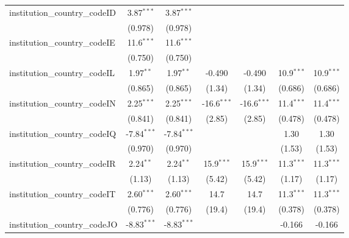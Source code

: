 \begin{tabular}{lcccccc}
   institution\_country\_codeID          & 3.87$^{***}$   & 3.87$^{***}$   &               &               &               &   \\   
                                         & (0.978)        & (0.978)        &               &               &               &   \\   
   institution\_country\_codeIE          & 11.6$^{***}$   & 11.6$^{***}$   &               &               &               &   \\   
                                         & (0.750)        & (0.750)        &               &               &               &   \\   
   institution\_country\_codeIL          & 1.97$^{**}$    & 1.97$^{**}$    & -0.490        & -0.490        & 10.9$^{***}$  & 10.9$^{***}$\\   
                                         & (0.865)        & (0.865)        & (1.34)        & (1.34)        & (0.686)       & (0.686)\\   
   institution\_country\_codeIN          & 2.25$^{***}$   & 2.25$^{***}$   & -16.6$^{***}$ & -16.6$^{***}$ & 11.4$^{***}$  & 11.4$^{***}$\\   
                                         & (0.841)        & (0.841)        & (2.85)        & (2.85)        & (0.478)       & (0.478)\\   
   institution\_country\_codeIQ          & -7.84$^{***}$  & -7.84$^{***}$  &               &               & 1.30          & 1.30\\   
                                         & (0.970)        & (0.970)        &               &               & (1.53)        & (1.53)\\   
   institution\_country\_codeIR          & 2.24$^{**}$    & 2.24$^{**}$    & 15.9$^{***}$  & 15.9$^{***}$  & 11.3$^{***}$  & 11.3$^{***}$\\   
                                         & (1.13)         & (1.13)         & (5.42)        & (5.42)        & (1.17)        & (1.17)\\   
   institution\_country\_codeIT          & 2.60$^{***}$   & 2.60$^{***}$   & 14.7          & 14.7          & 11.3$^{***}$  & 11.3$^{***}$\\   
                                         & (0.776)        & (0.776)        & (19.4)        & (19.4)        & (0.378)       & (0.378)\\   
   institution\_country\_codeJO          & -8.83$^{***}$  & -8.83$^{***}$  &               &               & -0.166        & -0.166\\   

\end{tabular}
